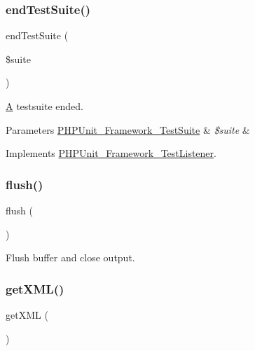 \subsubsection{\texorpdfstring{end\+Test\+Suite()}{endTestSuite()}}
{\footnotesize\ttfamily end\+Test\+Suite (\begin{DoxyParamCaption}\item[{\mbox{\hyperlink{class_p_h_p_unit___framework___test_suite}{P\+H\+P\+Unit\+\_\+\+Framework\+\_\+\+Test\+Suite}}}]{\$suite }\end{DoxyParamCaption})}

\mbox{\hyperlink{class_a}{A}} testsuite ended.


\begin{DoxyParams}[1]{Parameters}
\mbox{\hyperlink{class_p_h_p_unit___framework___test_suite}{P\+H\+P\+Unit\+\_\+\+Framework\+\_\+\+Test\+Suite}} & {\em \$suite} & \\
\hline
\end{DoxyParams}


Implements \mbox{\hyperlink{interface_p_h_p_unit___framework___test_listener_aeec28a4d1328434916ebcdc1ca6b5527}{P\+H\+P\+Unit\+\_\+\+Framework\+\_\+\+Test\+Listener}}.

\mbox{\label{class_p_h_p_unit___util___log___j_unit_a7751f77b5263bcf940ece6e824a05b38}} 
\subsubsection{\texorpdfstring{flush()}{flush()}}
{\footnotesize\ttfamily flush (\begin{DoxyParamCaption}{ }\end{DoxyParamCaption})}

Flush buffer and close output. \mbox{\label{class_p_h_p_unit___util___log___j_unit_af18f946b8766fa1799890dfd500004fc}} 
\subsubsection{\texorpdfstring{get\+X\+M\+L()}{getXML()}}
{\footnotesize\ttfamily get\+X\+ML (\begin{DoxyParamCaption}{ }\end{DoxyParamCaption})}

